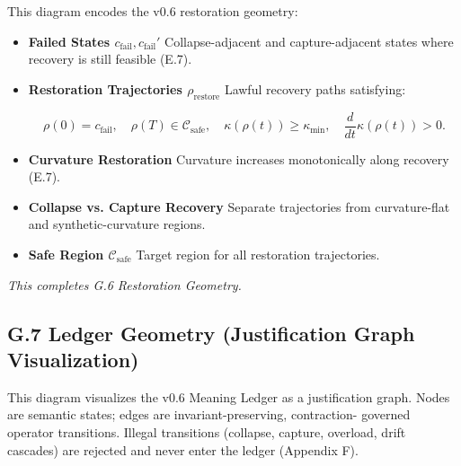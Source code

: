 \medskip

\noindent
This diagram encodes the v0.6 restoration geometry:

\begin{itemize}
    \item \textbf{Failed States $c_{\mathrm{fail}}, c_{\mathrm{fail}}'$}  
    Collapse-adjacent and capture-adjacent states where recovery is still
    feasible (E.7).

    \item \textbf{Restoration Trajectories $\rho_{\mathrm{restore}}$}  
    Lawful recovery paths satisfying:
    

\[
    \rho(0) = c_{\mathrm{fail}},
    \quad
    \rho(T) \in \mathcal{C}_{\mathrm{safe}},
    \quad
    \kappa(\rho(t)) \ge \kappa_{\min},
    \quad
    \frac{d}{dt}\kappa(\rho(t)) > 0.
    \]



    \item \textbf{Curvature Restoration}  
    Curvature increases monotonically along recovery (E.7).

    \item \textbf{Collapse vs. Capture Recovery}  
    Separate trajectories from curvature-flat and synthetic-curvature regions.

    \item \textbf{Safe Region $\mathcal{C}_{\mathrm{safe}}$}  
    Target region for all restoration trajectories.
\end{itemize}

\medskip

\noindent
\textit{This completes G.6 Restoration Geometry.}



\subsection*{G.7 Ledger Geometry (Justification Graph Visualization)}

\noindent This diagram visualizes the v0.6 Meaning Ledger as a justification
graph. Nodes are semantic states; edges are invariant-preserving, contraction-
governed operator transitions. Illegal transitions (collapse, capture, overload,
drift cascades) are rejected and never enter the ledger (Appendix F).

